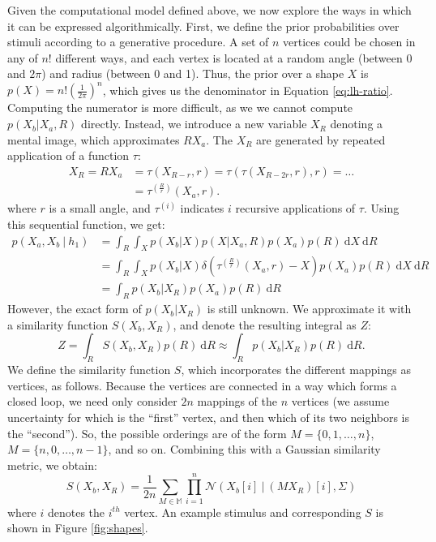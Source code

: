 \documentclass{article} %
\begin{document}
Given the computational model defined above, we now explore the ways
in which it can be expressed algorithmically. First, we define the
prior probabilities over stimuli according to a generative
procedure. A set of $n$ vertices could be chosen in any of $n!$
different ways, and each vertex is located at a random angle (between
0 and $2\pi$) and radius (between 0 and 1). Thus, the prior over a
shape $X$ is $p(X)=n!\left(\frac{1}{2\pi}\right)^n$, which gives us
the denominator in Equation \ref{eq:lh-ratio}. Computing the numerator
is more difficult, as we we cannot compute $p(X_b\vert X_a, R)$
directly. Instead, we introduce a new variable $X_R$ denoting a mental
image, which approximates $RX_a$. The $X_R$ are generated by repeated
application of a function $\tau$:
\begin{align}
  X_R=RX_a&=\tau(X_{R-r}, r)=\tau(\tau(X_{R-2r}, r), r)=\ldots{}\nonumber \\
  &=\tau^{(\frac{R}{r})}(X_a, r).
  \label{eq:tau}
\end{align} 
where $r$ is a small angle, and $\tau^{(i)}$ indicates $i$ recursive
applications of $\tau$. Using this sequential function, we get:
\begin{align}
  p(X_a, X_b\ \vert \ h_1)&=\int_R \int_{X} p(X_b\vert X) p(X\vert X_a, R)p(X_a)p(R)\ \mathrm{d}X\ \mathrm{d}R \nonumber \\
  &= \int_R \int_X p(X_b\vert X)\delta(\tau^{(\frac{R}{r})}(X_a, r)-X)p(X_a)p(R)\ \mathrm{d}X\ \mathrm{d}R \nonumber \\
  &= \int_R p(X_b\vert X_R)p(X_a)p(R)\ \mathrm{d}R
\end{align}
However, the exact form of $p(X_b\vert X_R)$ is still unknown. We
approximate it with a similarity function $S(X_b, X_R)$, and denote
the resulting integral as $Z$:
\begin{equation}
Z=\int_R S(X_b, X_R)p(R)\ \mathrm{d}R\approx \int_R p(X_b\vert X_R)p(R)\ \mathrm{d}R.
\label{eq:Z}
\end{equation}
We define the similarity function $S$, which incorporates the
different mappings as vertices, as follows. Because the vertices are
connected in a way which forms a closed loop, we need only consider
$2n$ mappings of the $n$ vertices (we assume uncertainty for which is
the ``first'' vertex, and then which of its two neighbors is the
``second''). So, the possible orderings are of the form $M=\lbrace{}0,
1, \ldots{}, n\rbrace{}$, $M=\lbrace{}n, 0, \ldots{}, n-1\rbrace{}$,
and so on. Combining this with a Gaussian similarity metric, we
obtain:
\begin{equation}
  S(X_b, X_R)=\frac{1}{2n}\sum_{M\in\mathbb{M}}\prod_{i=1}^n\mathcal{N}(X_b[i]\ \vert \ (MX_R)[i], \Sigma)
  \label{eq:similarity}
\end{equation}
where $i$ denotes the $i^{th}$ vertex. An example stimulus and
corresponding $S$ is shown in Figure \ref{fig:shapes}.
\end{document}
